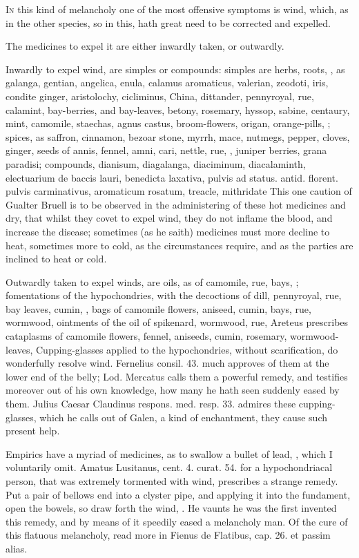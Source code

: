 \lettrine{I}{n} this kind of melancholy one of the most offensive symptoms is wind,
which, as in the other species, so in this, hath great need to be
corrected and expelled.

The medicines to expel it are either inwardly taken, or outwardly.

Inwardly to expel wind, are simples or compounds: simples are herbs,
roots, \etc{}, as galanga, gentian, angelica, enula, calamus aromaticus,
valerian, zeodoti, iris, condite ginger, aristolochy, cicliminus,
China, dittander, pennyroyal, rue, calamint, bay-berries, and
bay-leaves, betony, rosemary, hyssop, sabine, centaury, mint, camomile,
staechas, agnus castus, broom-flowers, origan, orange-pills, \etc{};
spices, as saffron, cinnamon, bezoar stone, myrrh, mace, nutmegs,
pepper, cloves, ginger, seeds of annis, fennel, amni, cari, nettle,
rue, \etc{}, juniper berries, grana paradisi; compounds, dianisum,
diagalanga, diaciminum, diacalaminth, electuarium de baccis lauri,
benedicta laxativa, pulvis ad status. antid. florent. pulvis
carminativus, aromaticum rosatum, treacle, mithridate \etc{} This one
caution of Gualter Bruell is to be observed in the administering
of these hot medicines and dry, that whilst they covet to expel wind,
they do not inflame the blood, and increase the disease; sometimes (as
he saith) medicines must more decline to heat, sometimes more to cold,
as the circumstances require, and as the parties are inclined to heat
or cold.

Outwardly taken to expel winds, are oils, as of camomile, rue, bays,
\etc{}; fomentations of the hypochondries, with the decoctions of dill,
pennyroyal, rue, bay leaves, cumin, \etc{}, bags of camomile flowers,
aniseed, cumin, bays, rue, wormwood, ointments of the oil of spikenard,
wormwood, rue, \etc{} Areteus prescribes cataplasms of camomile
flowers, fennel, aniseeds, cumin, rosemary, wormwood-leaves, \etc{}
Cupping-glasses applied to the hypochondries, without
scarification, do wonderfully resolve wind. Fernelius consil. 43. much
approves of them at the lower end of the belly; Lod. Mercatus
calls them a powerful remedy, and testifies moreover out of his own
knowledge, how many he hath seen suddenly eased by them. Julius Caesar
Claudinus respons. med. resp. 33. admires these cupping-glasses, which
he calls out of Galen, a kind of enchantment, they cause such
present help.

Empirics have a myriad of medicines, as to swallow a bullet of lead,
\etc{}, which I voluntarily omit. Amatus Lusitanus, cent. 4. curat. 54.
for a hypochondriacal person, that was extremely tormented with wind,
prescribes a strange remedy. Put a pair of bellows end into a clyster
pipe, and applying it into the fundament, open the bowels, so draw
forth the wind, . He vaunts he was the first
invented this remedy, and by means of it speedily eased a melancholy
man. Of the cure of this flatuous melancholy, read more in \textlatin{Fienus de
Flatibus, cap. 26. et passim alias.}

